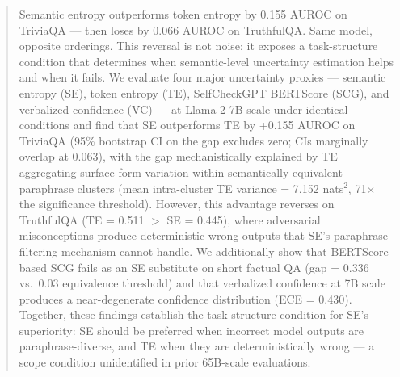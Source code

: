 \begin{abstract}
Semantic entropy outperforms token entropy by 0.155 AUROC on TriviaQA --- then loses by 0.066 AUROC on TruthfulQA.
Same model, opposite orderings.
This reversal is not noise: it exposes a task-structure condition that determines when semantic-level uncertainty estimation helps and when it fails.
We evaluate four major uncertainty proxies --- semantic entropy (SE), token entropy (TE), SelfCheckGPT BERTScore (SCG), and verbalized confidence (VC) --- at Llama-2-7B scale under identical conditions and find that SE outperforms TE by +0.155 AUROC on TriviaQA (95\% bootstrap CI on the gap excludes zero; CIs marginally overlap at 0.063), with the gap mechanistically explained by TE aggregating surface-form variation within semantically equivalent paraphrase clusters (mean intra-cluster TE variance = 7.152 nats$^2$, 71$\times$ the significance threshold).
However, this advantage reverses on TruthfulQA (TE = 0.511 $>$ SE = 0.445), where adversarial misconceptions produce deterministic-wrong outputs that SE's paraphrase-filtering mechanism cannot handle.
We additionally show that BERTScore-based SCG fails as an SE substitute on short factual QA (gap = 0.336 vs.\ 0.03 equivalence threshold) and that verbalized confidence at 7B scale produces a near-degenerate confidence distribution (ECE = 0.430).
Together, these findings establish the task-structure condition for SE's superiority: SE should be preferred when incorrect model outputs are paraphrase-diverse, and TE when they are deterministically wrong --- a scope condition unidentified in prior 65B-scale evaluations.
\end{abstract}

